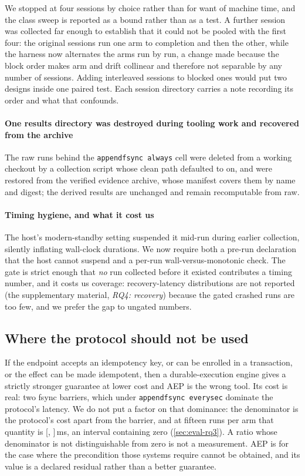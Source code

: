 We stopped at four sessions by choice rather than for want of machine
time, and the class sweep is reported as a bound rather than as a test.
A further session was collected far enough to establish that it could
not be pooled with the first four: the original sessions run one arm to
completion and then the other, while the harness now alternates the arms
run by run, a change made because the block order makes arm and drift
collinear and therefore not separable by any number of sessions. Adding
interleaved sessions to blocked ones would put two designs inside one
paired test. Each session directory carries a note recording its order and
what that confounds.

\paragraph{One results directory was destroyed during tooling work and
recovered from the archive} The raw runs behind the \texttt{appendfsync
always} cell were deleted from a working checkout by a collection script
whose clean path defaulted to on, and were restored from the verified
evidence archive, whose manifest covers them by name and digest; the
derived results are unchanged and remain recomputable from raw.

\paragraph{Timing hygiene, and what it cost us} The host's modern-standby
setting suspended it mid-run during earlier collection, silently inflating
wall-clock durations. We now require both a pre-run declaration that the host
cannot suspend and a per-run wall-versus-monotonic check. The gate is strict
enough that \emph{no} run collected before it existed contributes a timing
number, and it costs us coverage: recovery-latency distributions are not
reported (the supplementary material, \emph{RQ4: recovery}) because the
gated crashed runs are too few, and
we prefer the gap to ungated numbers.

\subsection{Where the protocol should not be used}

If the endpoint accepts an idempotency key, or can be enrolled in a
transaction, or the effect can be made idempotent, then a durable-execution
engine gives a strictly stronger guarantee at lower cost and AEP is the wrong
tool. Its cost is real: two fsync barriers, which under \texttt{appendfsync
everysec} dominate the protocol's latency. We do not put a factor on that
dominance: the denominator is the protocol's cost apart from the barrier, and
at fifteen runs per arm that quantity is
[\ProtocolMinusBarrierFifteenLow{}, \ProtocolMinusBarrierFifteenHigh{}]\,ms,
an interval containing zero (\cref{sec:eval-rq3}). A ratio whose denominator
is not distinguishable from zero is not a measurement. AEP is for the case where the precondition those systems
require cannot be obtained, and its value is a declared residual rather than a
better guarantee.
